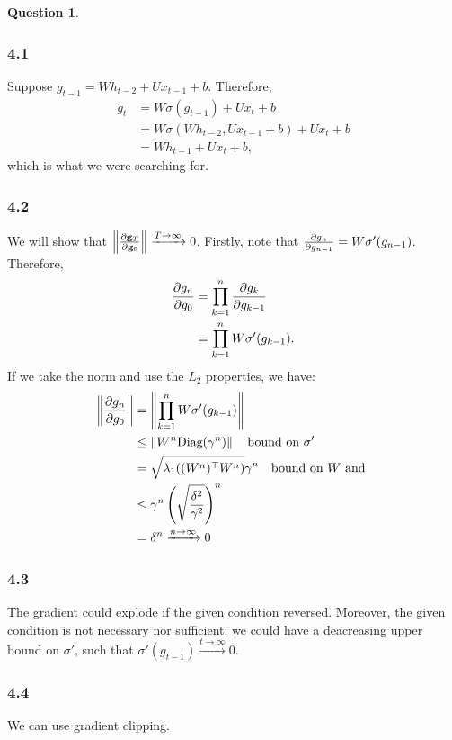 \documentclass[12pt]{article}
\theoremstyle{definition}
\newtheorem{exercise}{Question}%
\begin{document}
\begin{exercise}
{    \subsubsection*{4.1}
    Suppose $g_{t-1} = W h _{t-2} +U x_{t-1} + b$. Therefore,
    \begin{align*}
    g_{t}   &= W \sigma(g_{t-1}) + U x_{t} + b \\
           &= W \sigma(W h_{t-2} , U x_{t-1} + b) + U x_{t} + b \\
           &= W h_{t-1} + U x_{t} + b,
    \end{align*}which is what we were searching for.
    \subsubsection*{4.2}
    We will show that
    $\left\Vert \frac{\partial \mathbf{g}_{T}}{\partial \mathbf{g}_{0}} \right\Vert \xrightarrow{T\to \infty}0$.
    Firstly, note that $\frac{\partial g_{n}}{\partial g_{n-1}} = W \sigma'(g_{n-1})$. Therefore,
    \begin{align*}
      \frac{\partial g_{n}}{\partial g_{0}} &= \prod_{k = 1}^{n} \frac{\partial g_{k}}{\partial g_{k-1}}\\
      &= \prod_{k=1}^{n} W \sigma'(g_{k-1}).
    \end{align*}
    If we take the norm and use the $L_{2}$ properties, we have:
    \begin{align*}
      \left\Vert \frac{\partial g_{n}}{\partial g_{0}} \right\Vert &= \left\Vert \prod_{k=1}^{n} W \sigma'(g_{k-1}) \right\Vert\\
                               &\leq \left\Vert W^{n} \text{Diag}(\gamma^{n}) \right\Vert \quad \text{bound
                                 on $\sigma'$}\\
                               &= \sqrt{\lambda_{1}((W^{n})^{\top}W^{n})}\gamma^{n}\quad \text{bound
                                 on $W$ and }\\
                               & \leq \gamma^{n} \left( \sqrt{\frac{\delta^{2}}{\gamma^{2}}} \right)^{n}\\
                                 &= \delta^{n} \xrightarrow{n \to \infty}0
    \end{align*}
    \subsubsection*{4.3}
    The gradient could explode if the given condition reversed.  Moreover, the
    given condition is not necessary nor sufficient: we could have a deacreasing
    upper bound on $\sigma'$, such that $\sigma'(g_{t-1}) \xrightarrow{t \to \infty} 0$.
    \subsubsection*{4.4}
    We can use gradient clipping.
    }
\end{exercise}
\end{document}
